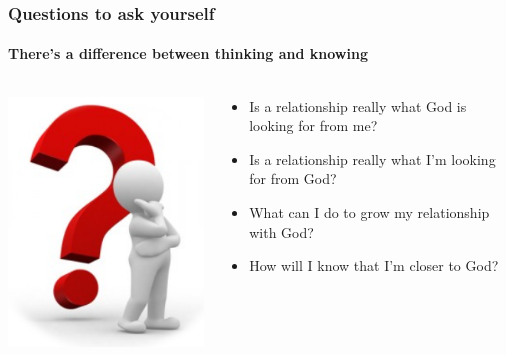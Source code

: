 \begin{frame}
\frametitle{Questions to ask yourself}
\framesubtitle{There's a difference between thinking and knowing}
\begin{columns}
	\begin{column}{0.3\textwidth}
		\includegraphics[width=\columnwidth]{figures/contemplating.png}
	\end{column}
	\begin{column}{0.7\textwidth}
		\begin{itemize}	
		\item Is a relationship really what God is looking for from me?
		\item Is a relationship really what I'm looking for from God?
		\item What can I do to grow my relationship with God?
		\item How will I know that I'm closer to God?
		\end{itemize}
	\end{column}
\end{columns}
\end{frame}

